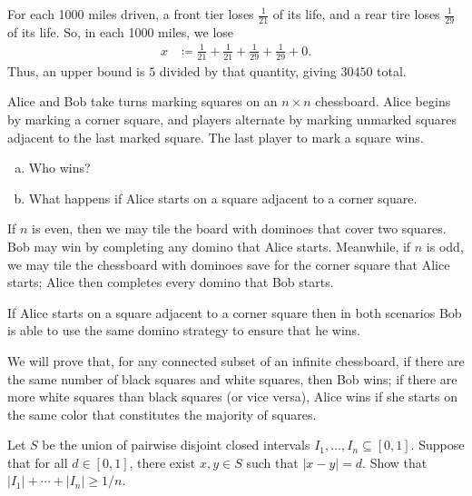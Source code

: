 \documentclass[10pt]{mypackage}
\begin{document}
\begin{solution}
  For each 1000 miles driven, a front tier loses $\frac{1}{21}$ of its life, and a rear tire loses $\frac{1}{29}$ of its life. So, in each 1000 miles, we lose
  \begin{align*}
    x &\coloneq \frac{1}{21} + \frac{1}{21} + \frac{1}{29} + \frac{1}{29} + 0.
  \end{align*}
  Thus, an upper bound is $5$ divided by that quantity, giving $30450$ total.
\end{solution}
\begin{problem}
Alice and Bob take turns marking squares on an $n\times n$ chessboard. Alice begins by marking a corner square, and players alternate by marking unmarked squares adjacent to the last marked square. The last player to mark a square wins.
\begin{enumerate}[(a)]
  \item Who wins?
  \item What happens if Alice starts on a square adjacent to a corner square.
\end{enumerate}
\end{problem}
\begin{solution}
  If $n$ is even, then we may tile the board with dominoes that cover two squares. Bob may win by completing any domino that Alice starts. Meanwhile, if $n$ is odd, we may tile the chessboard with dominoes save for the corner square that Alice starts; Alice then completes every domino that Bob starts.\newline

  If Alice starts on a square adjacent to a corner square then in both scenarios Bob is able to use the same domino strategy to ensure that he wins.
\end{solution}
\begin{solution}
  We will prove that, for any connected subset of an infinite chessboard, if there are the same number of black squares and white squares, then Bob wins; if there are more white squares than black squares (or vice versa), Alice wins if she starts on the same color that constitutes the majority of squares.
\end{solution}
\begin{problem}
  Let $S$ be the union of pairwise disjoint closed intervals $I_1,\dots,I_n\subseteq [0,1]$. Suppose that for all $d\in [0,1]$, there exist $x,y\in S$ such that $\left\vert x-y \right\vert = d$. Show that $\left\vert I_1 \right\vert + \cdots + \left\vert I_n \right\vert \geq 1/n$.
\end{problem}
\end{document}
